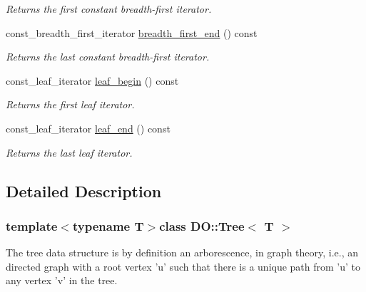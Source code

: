 \begin{DoxyCompactItemize}
\begin{DoxyCompactList}\small\item\em Returns the first constant breadth-\/first iterator. \end{DoxyCompactList}\item 
\hypertarget{class_d_o_1_1_tree_aca0ea756c48799d75381de9ef0cce128}{const\-\_\-breadth\-\_\-first\-\_\-iterator \hyperlink{class_d_o_1_1_tree_aca0ea756c48799d75381de9ef0cce128}{breadth\-\_\-first\-\_\-end} () const }\label{class_d_o_1_1_tree_aca0ea756c48799d75381de9ef0cce128}

\begin{DoxyCompactList}\small\item\em Returns the last constant breadth-\/first iterator. \end{DoxyCompactList}\item 
\hypertarget{class_d_o_1_1_tree_a8abf8ade23ce8300e97f274e178c2410}{const\-\_\-leaf\-\_\-iterator \hyperlink{class_d_o_1_1_tree_a8abf8ade23ce8300e97f274e178c2410}{leaf\-\_\-begin} () const }\label{class_d_o_1_1_tree_a8abf8ade23ce8300e97f274e178c2410}

\begin{DoxyCompactList}\small\item\em Returns the first leaf iterator. \end{DoxyCompactList}\item 
\hypertarget{class_d_o_1_1_tree_a3906bbeeb57d6a406530290e49081eb3}{const\-\_\-leaf\-\_\-iterator \hyperlink{class_d_o_1_1_tree_a3906bbeeb57d6a406530290e49081eb3}{leaf\-\_\-end} () const }\label{class_d_o_1_1_tree_a3906bbeeb57d6a406530290e49081eb3}

\begin{DoxyCompactList}\small\item\em Returns the last leaf iterator. \end{DoxyCompactList}\end{DoxyCompactItemize}


\subsection{Detailed Description}
\subsubsection*{template$<$typename T$>$class D\-O\-::\-Tree$<$ T $>$}

The tree data structure is by definition an arborescence, in graph theory, i.\-e., an directed graph with a root vertex 'u' such that there is a unique path from 'u' to any vertex 'v' in the tree. 


